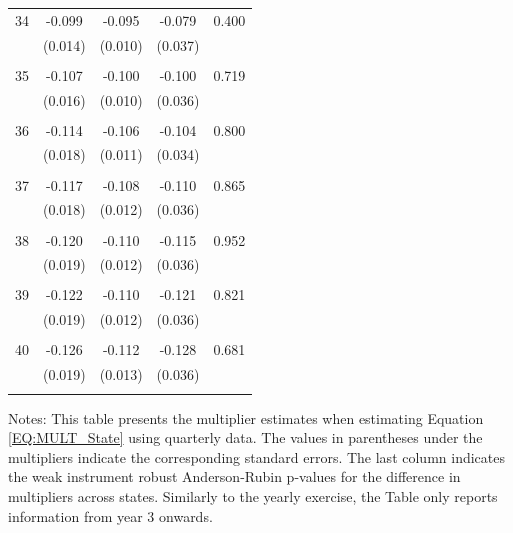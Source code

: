 \documentclass[12pt]{article}
\newcommand{\annote}[1]{\parbox{\textwidth}{\renewcommand{\baselinestretch}{1.0}\vspace{12pt} \footnotesize Notes: #1}}
\begin{document}
\begin{appendices}
\begin{singlespace}
{{\begin{longtable}{l*{1}{cccc}}
  34       & -0.099 & -0.095 & -0.079 & 0.400 \\
          & (0.014) & (0.010) & (0.037) & \\
 & & & &\\
  35       & -0.107 & -0.100 & -0.100 & 0.719 \\
          & (0.016) & (0.010) & (0.036) & \\
 & & & &\\
  36       & -0.114 & -0.106 & -0.104 & 0.800 \\
          & (0.018) & (0.011) & (0.034) & \\
 & & & &\\
  37       & -0.117 & -0.108 & -0.110 & 0.865 \\
          & (0.018) & (0.012) & (0.036) & \\
 & & & &\\
  38       & -0.120 & -0.110 & -0.115 & 0.952 \\
          & (0.019) & (0.012) & (0.036) & \\
 & & & &\\
  39       & -0.122 & -0.110 & -0.121 & 0.821 \\
          & (0.019) & (0.012) & (0.036) & \\
 & & & &\\
  40       & -0.126 & -0.112 & -0.128 & 0.681 \\
          & (0.019) & (0.013) & (0.036) & \\
 & & & &\\
\hline\hline
\end{longtable}
\annote{\footnotesize This table presents the multiplier estimates when estimating Equation \eqref{EQ:MULT_State} using quarterly data. The values in parentheses under the multipliers indicate the corresponding standard errors. The last column indicates the weak instrument robust Anderson-Rubin p-values for the difference in multipliers across states. Similarly to the yearly exercise, the Table only reports information from year 3 onwards.}
}}

\clearpage

%	



\end{singlespace}
\end{appendices}
\end{document}
